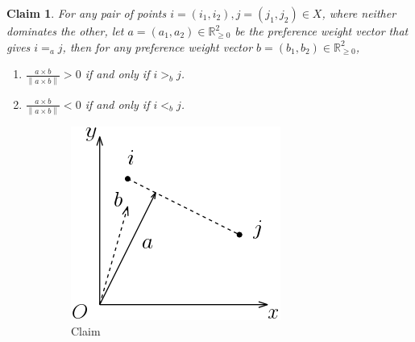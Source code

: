 \documentclass[12pt]{article}
\newtheorem{claim}[theorem]{Claim}
\newcommand{\R}{\mathbb{R}}
\newcommand{\norm}[1]{\left\lVert{#1}\right\rVert}
\newcommand{\1}[1]{\mathds{1}[{#1}]}
\begin{document}
\begin{claim} \label{clm:pair}
For any pair of points $i = (i_1, i_2), j = (j_1, j_2) \in X$, where neither dominates the other, let $a = (a_1, a_2) \in \R_{\geq 0}^2$ be the preference weight vector that gives $i =_a j$, then for any preference weight vector $b = (b_1, b_2) \in \R_{\geq 0}^2$,
\begin{enumerate}
	\item \label{clm:pair1} $\frac{a \times b}{\norm{a \times b}} > 0$ if and only if $i >_b j$.
	\item \label{clm:pair2} $\frac{a \times b}{\norm{a \times b}} < 0$ if and only if $i <_b j$.
\end{enumerate}
\end{claim}

\begin{figure}
    \centering
    \begin{subfigure}[b]{0.25\textwidth}
        \includegraphics[width=\textwidth]{clm1}
        \caption{Claim}
        \label{fig:clm1}
    \end{subfigure}
    ~ %
    \begin{subfigure}[b]{0.25\textwidth}

\end{subfigure}
\end{figure}
\end{document}
